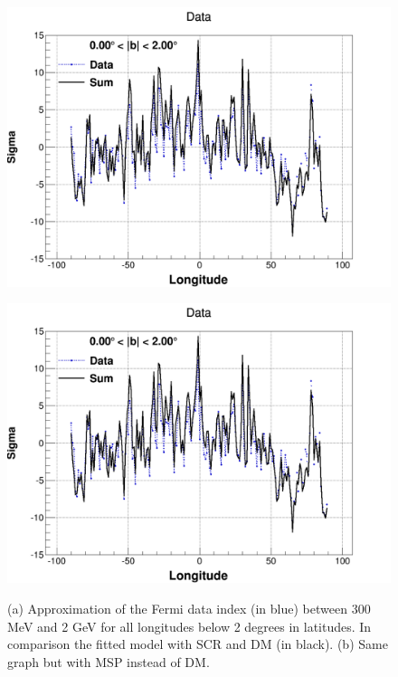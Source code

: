\begin{figure}[H]
  \centering
  \begin{minipage}[h]{0.45\textwidth}
	  \centering
	  \includegraphics[width=\linewidth]{pic/results/MSPonly_weniger.png}	  
  	  \subcaption{}
	  \label{fig:DMonly_weniger}
  \end{minipage}
  \hfill
  \begin{minipage}[h]{0.45\textwidth}
	  \centering
	  \includegraphics[width=\linewidth]{pic/results/MSPonly_weniger.png}
	  \subcaption{}
  	  \label{fig:MSPonly_weniger}
  \end{minipage}
  \caption[DM and MSP spectral indexes graph.]{(a)  Approximation of the Fermi data index (in blue) between 300 MeV and 2 GeV for all longitudes below 2 degrees in latitudes. In comparison the fitted model with SCR and DM (in black). (b) Same graph but with MSP instead of DM.}
  \label{fig:DM_and_MSP_weniger}
\end{figure}


